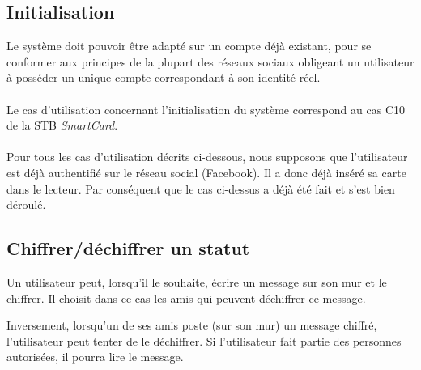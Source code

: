 \documentclass[a4paper,11pt,french]{article}
\begin{document}
\subsection{Initialisation}
Le système doit pouvoir être adapté sur un compte déjà existant, pour se 
conformer aux principes de la plupart des réseaux sociaux obligeant un 
utilisateur à posséder un unique compte correspondant à son identité réel.

\paragraph{}
Le cas d'utilisation concernant l'initialisation du système correspond 
au cas C10 de la STB \emph{SmartCard}.

\paragraph{}
Pour tous les cas d'utilisation décrits ci-dessous, nous supposons que 
l'utilisateur est déjà authentifié sur le réseau social (Facebook). Il
a donc déjà inséré sa carte dans le lecteur. Par conséquent que le cas
ci-dessus a déjà été fait et s'est bien déroulé.

\subsection{Chiffrer/déchiffrer un statut}
Un utilisateur peut, lorsqu'il le souhaite, écrire un message
sur son mur et le chiffrer. Il choisit dans ce cas les amis
qui peuvent déchiffrer ce message.

Inversement, lorsqu'un de ses amis poste (sur son mur) un message chiffré,
l'utilisateur peut tenter de le déchiffrer. Si l'utilisateur
fait partie des personnes autorisées, il pourra lire le message.\\
\end{document}
